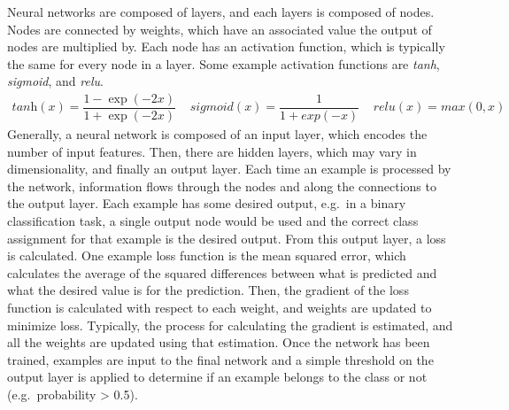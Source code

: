 
	
	
	
Neural networks  are composed of layers, and each layers is composed of nodes. Nodes are connected by weights, which have an associated value the output of nodes are multiplied by. Each node has an activation function, which is typically the same for every node in a layer.  Some example activation functions are \textit{tanh}, \textit{sigmoid}, and \textit{relu}.  
\begin{equation}
\begin{align*}
\textit{tanh}(x) = \dfrac{1 - \exp(-2x)}{ 1 + \exp(-2x)}\;\;\;\;
\textit{sigmoid}(x) = \dfrac{1}{1 + exp(-x)}\;\;\;\;
\textit{relu}(x) = \textit{max}(0, x)
\end{align*}
\end{equation}
 Generally, a neural network is composed of an  input layer, which encodes the number of input  features. Then, there are hidden layers, which may vary in dimensionality, and finally an output layer. Each time an example is processed by the network, information flows through the nodes and along the connections to the output layer. Each example has some desired output, e.g.\ in a binary classification task, a single output node would be used and the correct class assignment for that example is the desired output. From this output layer, a loss is calculated. One example loss function is the mean squared error, which calculates the average of the squared differences between what is predicted and what the desired value is for the prediction. Then, the gradient of the loss function is calculated with respect to each weight, and weights are updated to minimize loss. Typically, the process for calculating the gradient is estimated, and all the weights are updated using that estimation. Once the network has been trained, examples are input to the final network and a simple threshold on the output layer is applied to determine if an example belongs to the class or not (e.g.\ probability > 0.5). 


